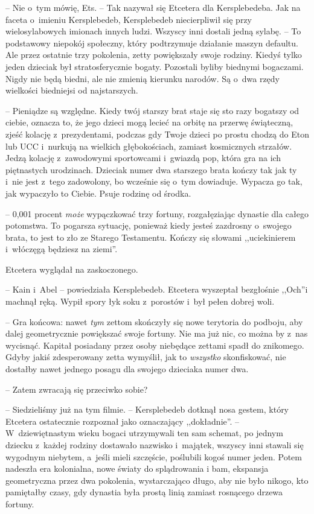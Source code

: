\documentclass[oneside,polish,11pt,sfheadings]{mwbk}
\begin{document}
-- Nie o~tym mówię, Ets. -- Tak nazywał się Etcetera dla Kersplebedeba.
Jak na faceta o~imieniu Kersplebedeb, Kersplebedeb niecierpliwił się
przy wielosylabowych imionach innych ludzi. Wszyscy inni dostali jedną
sylabę. -- To podstawowy niepokój społeczny, który podtrzymuje działanie
maszyn defaultu. Ale przez ostatnie trzy pokolenia, zetty powiększały
swoje rodziny. Kiedyś tylko jeden dzieciak był stratosferycznie bogaty.
Pozostali byliby biednymi bogaczami. Nigdy nie będą biedni, ale nie
zmienią kierunku narodów. Są o~dwa rzędy wielkości biedniejsi od
najstarszych.

-- Pieniądze są względne. Kiedy twój starszy brat staje się sto razy
bogatszy od ciebie, oznacza to, że jego dzieci mogą lecieć na orbitę na
przerwę świąteczną, zjeść kolację z~prezydentami, podczas gdy Twoje
dzieci po prostu chodzą do Eton lub UCC i~nurkują na wielkich
głębokościach, zamiast kosmicznych strzałów. Jedzą kolację z~zawodowymi
sportowcami i~gwiazdą pop, która gra na ich piętnastych urodzinach.
Dzieciak numer dwa starszego brata kończy tak jak ty i~nie jest z~tego
zadowolony, bo wcześnie się o~tym dowiaduje. Wypacza go tak, jak
wypaczyło to Ciebie. Psuje rodzinę od środka.

-- 0,001 procent \textit{może} wypączkować trzy fortuny, rozgałęziając
dynastie dla całego potomstwa. To pogarsza sytuację, ponieważ kiedy
jesteś zazdrosny o~swojego brata, to jest to zło ze Starego Testamentu.
Kończy się słowami ,,uciekinierem i~włóczęgą będziesz na ziemi''.

Etcetera wyglądał na zaskoczonego. 

-- Kain i~Abel -- powiedziała
Kersplebedeb. Etcetera wyszeptał bezgłośnie ,,Och''i machnął ręką. Wypił
spory łyk soku z~porostów i~był pełen dobrej woli.

-- Gra końcowa: nawet \textit{tym} zettom skończyły się nowe terytoria do
podboju, aby dalej geometrycznie powiększać swoje fortuny. Nie ma już
nic, co można by z~nas wycisnąć. Kapitał posiadany przez osoby niebędące
zettami spadł do znikomego. Gdyby jakiś zdesperowany zetta wymyślił, jak
to \textit{wszystko} skonfiskować, nie dostałby nawet jednego posagu dla
swojego dzieciaka numer dwa.

-- Zatem zwracają się przeciwko sobie?

-- Siedzieliśmy już na tym filmie. -- Kersplebedeb dotknął nosa gestem,
który Etcetera ostatecznie rozpoznał jako oznaczający ,,dokładnie''. -- W~dziewiętnastym wieku bogaci utrzymywali ten sam schemat, po jednym
dziecku z~każdej rodziny dostawało nazwisko i~majątek, wszyscy inni
stawali się wygodnym niebytem, a~jeśli mieli szczęście, poślubili kogoś
numer jeden. Potem nadeszła era kolonialna, nowe światy do splądrowania
i bam, ekspansja geometryczna przez dwa pokolenia, wystarczająco długo,
aby nie było nikogo, kto pamiętałby czasy, gdy dynastia była prostą
linią zamiast rosnącego drzewa fortuny.
\end{document}
